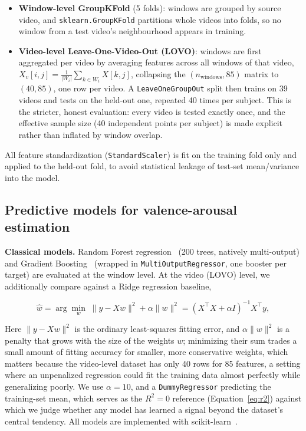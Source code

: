 \documentclass[conference]{IEEEtran}
\begin{document}
\begin{itemize}
\item \textbf{Window-level GroupKFold} (5 folds): windows are grouped by
source video, and \texttt{sklearn.GroupKFold} partitions whole videos into
folds, so no window from a test video's neighbourhood appears in training.
\item \textbf{Video-level Leave-One-Video-Out (LOVO)}: windows are first
aggregated per video by averaging features across all windows of that
video, $X_v[i,j] = \frac{1}{|W_i|}\sum_{k \in W_i} X[k,j]$, collapsing the
$(n_{\text{windows}}, 85)$ matrix to $(40, 85)$, one row per video. A
\texttt{LeaveOneGroupOut} split then trains on 39 videos and tests on the
held-out one, repeated 40 times per subject. This is the stricter,
honest evaluation: every video is tested exactly once, and the effective
sample size (40 independent points per subject) is made explicit rather
than inflated by window overlap.
\end{itemize}

All feature standardization (\texttt{StandardScaler}) is fit on the
training fold only and applied to the held-out fold, to avoid statistical
leakage of test-set mean/variance into the model.

\subsection{Predictive models for valence-arousal estimation}
\label{subsec:models}

\textbf{Classical models.} Random Forest regression~\cite{breiman2001randomforests}
(200 trees, natively multi-output) and Gradient
Boosting~\cite{friedman2001gradientboosting} (wrapped in
\texttt{MultiOutputRegressor}, one booster per target) are evaluated at
the window level. At the video (LOVO) level, we additionally compare
against a Ridge regression baseline,

\begin{equation}
\hat{w} = \arg\min_{w} \; \lVert y - Xw \rVert^2 + \alpha \lVert w \rVert^2
= (X^\top X + \alpha I)^{-1} X^\top y,
\label{eq:ridge}
\end{equation}

\noindent Here $\lVert y - Xw \rVert^2$ is the ordinary least-squares
fitting error, and $\alpha \lVert w \rVert^2$ is a penalty that grows
with the size of the weights $w$; minimizing their sum trades a small
amount of fitting accuracy for smaller, more conservative weights, which
matters because the video-level dataset has only 40 rows for 85 features,
a setting where an unpenalized regression could fit the training data
almost perfectly while generalizing poorly. We use $\alpha=10$, and a
\texttt{DummyRegressor} predicting the training-set mean, which serves as
the $R^2 = 0$ reference (Equation~\ref{eq:r2}) against which we judge
whether any model has learned a signal beyond the dataset's central
tendency. All models are implemented with
scikit-learn~\cite{pedregosa2011sklearn}.
\end{document}

